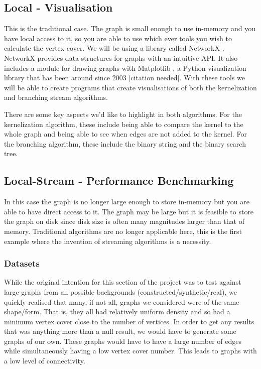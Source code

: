 \subsection{Local - Visualisation}

This is the traditional case. The graph is small enough to use in-memory and
you have local access to it, so you are able to use which ever tools you wish
to calculate the vertex cover. We will be using a library called NetworkX
\cite{hagberg2008exploring}. NetworkX provides data structures for graphs with
an intuitive API. It also includes a module for drawing graphs with Matplotlib
\cite{hunter2007matplotlib}, a Python visualization library that has been
around since 2003 [citation needed]. With these tools we will be able to create
programs that create visualisations of both the kernelization and branching
stream algorithms.

There are some key aspects we'd like to highlight in both algorithms. For the
kernelization algorithm, these include being able to compare the kernel to the
whole graph and being able to see when edges are not added to the kernel. For
the branching algorithm, these include the binary string and the binary search
tree.


\subsection{Local-Stream - Performance Benchmarking}

In this case the graph is no longer large enough to store in-memory but you are
able to have direct access to it. The graph may be large but it is feasible to
store the graph on disk since disk size is often many magnitudes larger than
that of memory. Traditional algorithms are no longer applicable here, this is
the first example where the invention of streaming algorithms is a necessity.

\subsubsection{Datasets}

While the original intention for this section of the project was to test
against large graphs from all possible backgrounds
(constructed/synthetic/real), we quickly realised that many, if not all, graphs
we considered were of the same shape/form. That is, they all had relatively
uniform density and so had a minimum vertex cover close to the number of
vertices. In order to get any results that was anything more than a null
result, we would have to generate some graphs of our own. These graphs would
have to have a large number of edges while simultaneously having a low vertex
cover number. This leads to graphs with a low level of connectivity.

